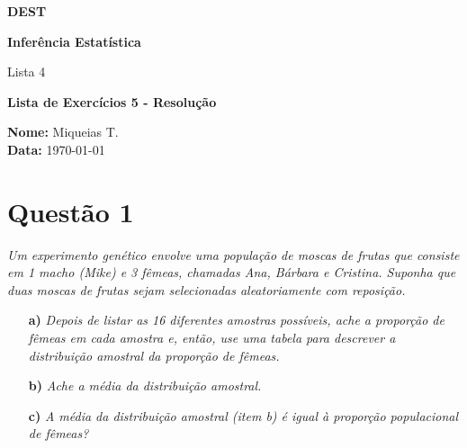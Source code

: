 \documentclass[12pt, a4paper]{article}
\begin{document}
\begin{titlepage}
    \centering


    {\Huge \textbf{DEST}}\par

    \vspace{2cm}

    {\Large \textbf{Inferência Estatística}} \par
    {\Large Lista 4 } \par

    \vspace{2.5cm}

    {\Large \textbf{Lista de Exercícios 5 - Resolução}}

    \vfill %

    \large
    \begin{flushleft}
    \textbf{Nome:} Miqueias T. \\
    \textbf{Data:} \today
    \end{flushleft}
\end{titlepage}




\section*{Questão 1}
\textit{Um experimento genético envolve uma população de moscas de frutas que consiste em 1 macho (Mike) e 3 fêmeas, chamadas Ana, Bárbara e Cristina. Suponha que duas moscas de frutas sejam selecionadas aleatoriamente com reposição.}

\begin{itemize}
    \item[\textbf{a)}] \textit{Depois de listar as 16 diferentes amostras possíveis, ache a proporção de fêmeas em cada amostra e, então, use uma tabela para descrever a distribuição amostral da proporção de fêmeas.}
    \item[\textbf{b)}] \textit{Ache a média da distribuição amostral.}
    \item[\textbf{c)}] \textit{A média da distribuição amostral (item b) é igual à proporção populacional de fêmeas?}
\end{itemize}
\end{document}
